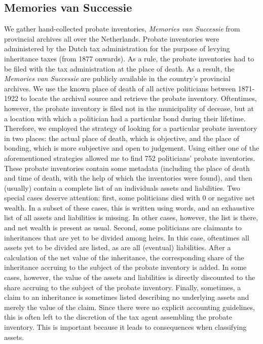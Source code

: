\subsection{Memories van Successie}
    We gather hand-collected probate inventories, \textit{Memories van Successie} from provincial archives all over the Netherlands. Probate inventories were administered by the Dutch tax administration for the purpose of levying inheritance taxes (from 1877 onwards). \autocite{bos1989memories} As a rule, the probate inventories had to be filed with the tax administration at the place of death. As a result, the \textit{Memories van Successie} are publicly available in the country's provincial archives. We use the known place of death of all active politicians between 1871-1922 to locate the archival source and retrieve the probate inventory. Oftentimes, however, the probate inventory is filed not in the municipality of decease, but at a location with which a politician had a particular bond during their lifetime. Therefore, we employed the strategy of looking for a particular probate inventory in two places: the actual place of death, which is objective, and the place of bonding, which is more subjective and open to judgement. Using either one of the aforementioned strategies allowed me to find 752 politicians' probate inventories. 
    These probate inventories contain some metadata (including the place of death and time of death, with the help of which the inventories were found), and then (usually) contain a complete list of an individuals assets and liabilities. Two special cases deserve attention: first, some politicians died with 0 or negative net wealth. In a subset of these cases, this is written using words, and an exhaustive list of all assets and liabilities is missing. In other cases, however, the list is there, and net wealth is present as usual. Second, some politicians are claimants to inheritances that are yet to be divided among heirs. In this case, oftentimes all assets yet to be divided are listed, as are all (eventual) liabilities. After a calculation of the net value of the inheritance, the corresponding share of the inheritance accruing to the subject of the probate inventory is added. In some cases, however, the value of the assets and liabilities is directly discounted to the share accruing to the subject of the probate inventory. Finally, sometimes, a claim to an inheritance is sometimes listed describing no underlying assets and merely the value of the claim. Since there were no explicit accounting guidelines, this is often left to the discretion of the tax agent assembling the probate inventory. This is important because it leads to consequences when classifying assets. 


